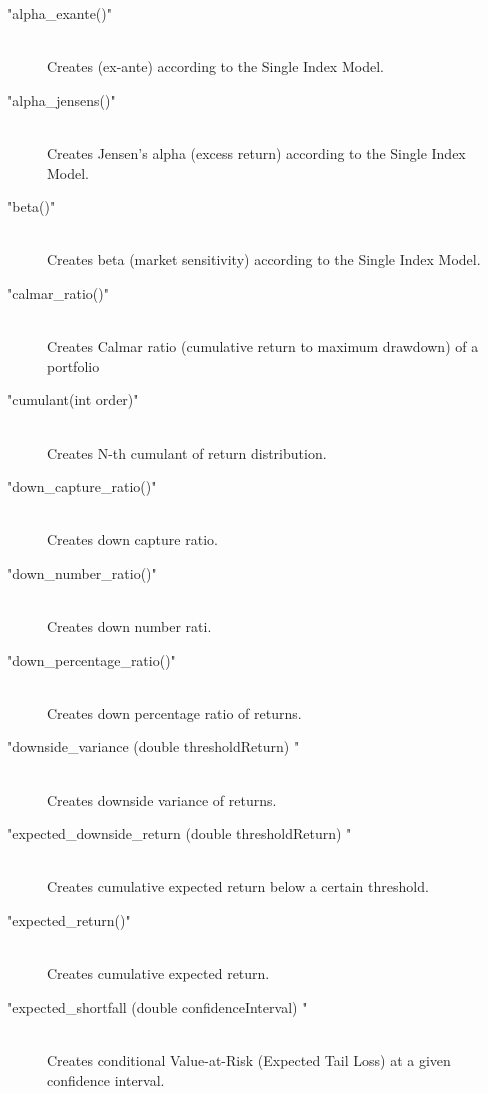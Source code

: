 \documentclass[letterpaper]{report}
\newcounter{N}
\begin{document}
  \begin{description} 

\item["alpha\_exante()"] \hfill \\ 
Creates  (ex-ante) according to the Single Index Model.


\item["alpha\_jensens()"] \hfill \\ 
Creates  Jensen's alpha (excess return) according to the Single
 Index Model.


\item["beta()"] \hfill \\ 
Creates  beta (market sensitivity) according to the Single Index
 Model.


\item["calmar\_ratio()"] \hfill \\ 
Creates Calmar ratio (cumulative return to maximum drawdown) of a
 portfolio


\item["cumulant(int order)"] \hfill \\ 
Creates N-th cumulant of  return distribution.


\item["down\_capture\_ratio()"] \hfill \\ 
Creates down capture ratio.


\item["down\_number\_ratio()"] \hfill \\ 
Creates down number rati.


\item["down\_percentage\_ratio()"] \hfill \\ 
Creates down percentage ratio of  returns.


\item["downside\_variance (double thresholdReturn) "] \hfill \\ 
Creates downside variance of  returns.


\item["expected\_downside\_return (double thresholdReturn) "] \hfill \\ 
Creates  cumulative expected return below a certain threshold.


\item["expected\_return()"] \hfill \\ 
Creates cumulative expected return.


\item["expected\_shortfall (double confidenceInterval) "] \hfill \\ 
Creates  conditional Value-at-Risk (Expected Tail Loss) at a
 given confidence interval.



\end{description}
\end{document}
